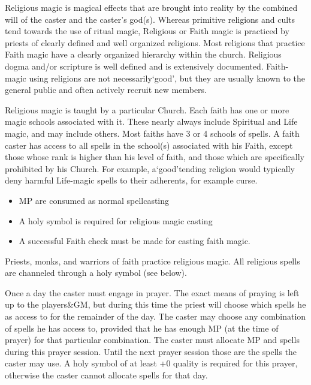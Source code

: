 \documentclass[twoside]{book}
\begin{document}
    {  
    Religious magic is magical effects that are brought into reality by the combined will of the caster and the caster's god(s). Whereas primitive religions and cults tend towards the use of ritual magic, Religious or Faith magic is practiced by priests of clearly defined and well organized religions. Most religions that practice Faith magic have a clearly organized hierarchy within the church. Religious dogma and/or scripture is well defined and is extensively documented. Faith-magic using religions are not necessarily`good', but they are usually known to the general public and often actively recruit new members.
    }
  
    {  
    Religious magic is taught by a particular Church. Each faith has one or more magic schools associated with it. These nearly always include Spiritual and Life magic, and may include others. Most faiths have 3 or 4 schools of spells. A faith caster has access to all spells in the school(s) associated with his Faith, except those whose rank is higher than his level of faith, and those which are specifically prohibited by his Church. For example, a`good'tending religion would typically deny harmful Life-magic spells to their adherents, for example curse.
    }
  
\begin{itemize}
      
  \item MP are consumed as normal spellcasting
  \item A holy symbol is required for religious magic casting
  \item A successful Faith check must be made for casting faith magic.
\end{itemize}
  
    {  
    Priests, monks, and warriors of faith practice religious magic. All religious spells are channeled through a holy symbol (see below).
    }
  
    {  
    Once a day the caster must engage in prayer. The exact means of praying is left up to the players\&GM, but during this time the priest will choose which spells he as access to for the remainder of the day. The caster may choose any combination of spells he has access to, provided that he has enough MP (at the time of prayer) for that particular combination. The caster must allocate MP and spells during this prayer session. Until the next prayer session those are the spells the caster may use. A holy symbol of at least +0 quality is required for this prayer, otherwise the caster cannot allocate spells for that day.
    }
  
\end{document}
